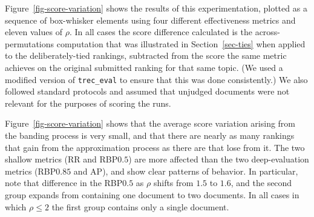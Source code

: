 Figure~\ref{fig-score-variation} shows the results of this
experimentation, plotted as a sequence of box-whisker elements using
four different effectiveness metrics and eleven values of $\rho$.
In all cases the score difference calculated is the
across-permutations computation that was illustrated in
Section~\ref{sec-ties} when applied to the deliberately-tied
rankings, subtracted from the score the same metric achieves on the
original submitted ranking for that same topic.
(We used a modified version of {\tt{trec\_eval}} to ensure that this
was done consistently.)
We also followed standard protocols and assumed that unjudged
documents were not relevant for the purposes of scoring the runs.

Figure~\ref{fig-score-variation} shows that the average score
variation arising from the banding process is very small, and that
there are nearly as many rankings that gain from the approximation
process as there are that lose from it.
The two shallow metrics (RR and RBP$0.5$) are more affected than the
two deep-evaluation metrics (RBP$0.85$ and AP), and show clear
patterns of behavior.
In particular, note that difference in the RBP$0.5$ as $\rho$ shifts
from $1.5$ to $1.6$, and the second group expands from containing one
document to two documents.
In all cases in which $\rho\le2$ the first group contains only a
single document.


